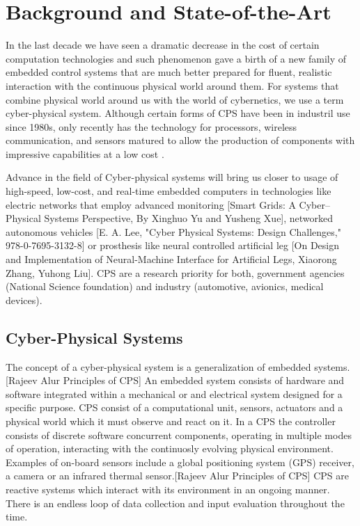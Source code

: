 \chapter{Background and State-of-the-Art}
\label{chap.stateoftheart}

In the last decade we have seen a dramatic decrease in the cost of certain computation technologies and such phenomenon gave a birth of a new family of embedded control systems that are much better prepared for fluent, realistic interaction with the continuous physical world around them. For systems that combine physical world around us with the world of cybernetics, we use a term cyber-physical system. Although certain forms of CPS have been in industril use since 1980s, only recently has the technology for processors, wireless communication, and sensors matured to allow the production of components with impressive capabilities at a low cost \cite{Rajeev:PrinciplesCPS}.

Advance in the field of Cyber-physical systems will bring us closer to usage of high-speed, low-cost, and real-time embedded computers in technologies like electric networks that employ advanced monitoring [Smart Grids: A Cyber–Physical Systems Perspective, By Xinghuo Yu and Yusheng Xue], networked autonomous vehicles [E. A. Lee, "Cyber Physical Systems: Design Challenges," 978-0-7695-3132-8] or prosthesis like neural controlled artificial leg [On Design and Implementation of Neural-Machine Interface for Artificial Legs, Xiaorong Zhang, Yuhong Liu]. CPS are a research priority for both, government agencies (National Science foundation) and industry (automotive, avionics, medical devices).

\section{Cyber-Physical Systems}

The concept of a cyber-physical system is a generalization of embedded systems.[Rajeev Alur Principles of CPS] An embedded system consists of hardware and software integrated within a mechanical or and electrical system designed for a specific purpose. CPS consist of a computational unit, sensors, actuators and a physical world which it must observe and react on it. In a CPS the controller consists of discrete software concurrent components, operating in multiple modes of operation, interacting with the continuosly evolving physical environment. Examples of on-board sensors include a global positioning system (GPS) receiver, a camera or an infrared thermal sensor.[Rajeev Alur Principles of CPS] CPS are reactive systems which interact with its environment in an ongoing manner. There is an endless loop of data collection and input evaluation throughout the time.

